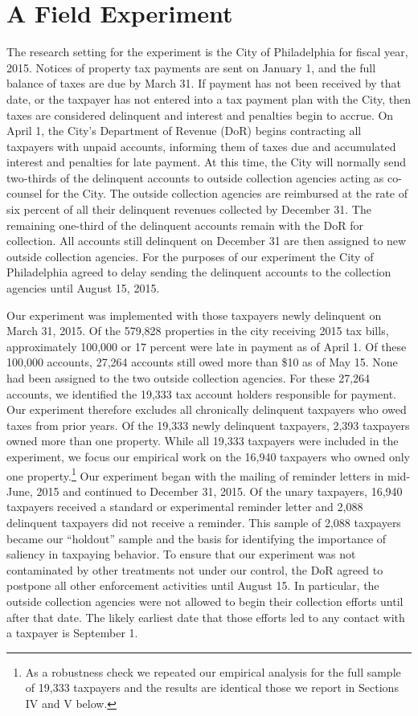 \documentclass[12pt]{article}
\begin{document}
\section{A Field Experiment }


The research setting for the experiment is the City of Philadelphia
for fiscal year, 2015.  Notices of property tax payments are sent on
January 1, and the full balance of taxes are due by March 31.  If
payment has not been received by that date, or the taxpayer has not
entered into a tax payment plan with the City, then taxes are
considered delinquent and interest and penalties begin to accrue.  On
April 1, the City's Department of Revenue (DoR) begins contracting all
taxpayers with unpaid accounts, informing them of taxes due and
accumulated interest and penalties for late payment.  At this time,
the City will normally send two-thirds of the delinquent accounts to
outside collection agencies acting as co-counsel for the City.  The
outside collection agencies are reimbursed at the rate of six percent
of all their delinquent revenues collected by December 31.  The
remaining one-third of the delinquent accounts remain with the DoR for
collection.  All accounts still delinquent on December 31 are then
assigned to new outside collection agencies. For the purposes of our
experiment the City of Philadelphia agreed to delay sending the
delinquent accounts to the collection agencies until August 15, 2015.

Our experiment was implemented with those taxpayers newly delinquent
on March 31, 2015.  Of the 579,828 properties in the city receiving
2015 tax bills, approximately 100,000 or 17 percent were late in
payment as of April 1.  Of these 100,000 accounts, 27,264 accounts
still owed more than \$10 as of May 15. None had been assigned to the
two outside collection agencies.  For these 27,264 accounts, we
identified the 19,333 tax account holders responsible for payment. Our
experiment therefore excludes all chronically delinquent taxpayers who
owed taxes from prior years.  Of the 19,333 newly delinquent
taxpayers, 2,393 taxpayers owned more than one property.  While all
19,333 taxpayers were included in the experiment, we focus our
empirical work on the 16,940 taxpayers who owned only one
property.\footnote{ As a robustness check we repeated our empirical
  analysis for the full sample of 19,333 taxpayers and the results are
  identical those we report in Sections IV and V below. }  Our
experiment began with the mailing of reminder letters in mid-June,
2015 and continued to December 31, 2015.  Of the unary taxpayers,
16,940 taxpayers received a standard or experimental reminder letter
and 2,088 delinquent taxpayers did not receive a reminder.  This
sample of 2,088 taxpayers became our ``holdout'' sample and the basis
for identifying the importance of saliency in taxpaying behavior. To
ensure that our experiment was not contaminated by other treatments
not under our control, the DoR agreed to postpone all other
enforcement activities until August 15.  In particular, the outside
collection agencies were not allowed to begin their collection efforts
until after that date.  The likely earliest date that those efforts
led to any contact with a taxpayer is September 1.
\end{document}
